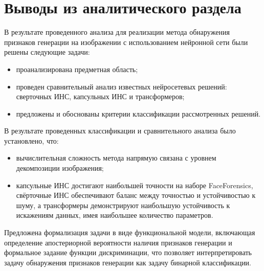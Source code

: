 \section{Выводы из аналитического раздела}

В результате проведенного анализа для реализации метода обнаружения признаков генерации на изображении с использованием нейронной сети были решены следующие задачи:
\begin{itemize}
	\item проанализирована предметная область;
	\item проведен сравнительный анализ известных нейросетевых решений: сверточных ИНС, капсульных ИНС и трансформеров;
	\item предложены и обоснованы критерии классификации рассмотренных решений.
\end{itemize}	

В результате проведенных классификации и сравнительного анализа было установлено, что:
\begin{itemize}	
	\item вычислительная сложность метода напрямую связана с уровнем декомпозиции изображения;
	\item капсульные ИНС достигают наибольшей точности на наборе FaceForensics, свёрточные ИНС обеспечивают баланс между точностью и устойчивостью к шуму, а трансформеры демонстрируют наибольшую устойчивость к искажениям данных, имея наибольшее количество параметров.
\end{itemize}

Предложена формализация задачи в виде функциональной модели, включающая определение апостериорной вероятности наличия признаков генерации и формальное задание функции дискриминации, что позволяет  интерпретировать задачу обнаружения признаков генерации как задачу бинарной классификации.